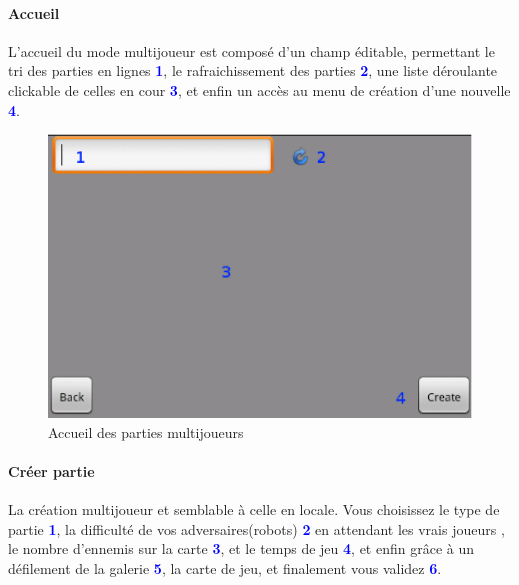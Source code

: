 	\paragraph{Accueil}
	L'accueil du mode multijoueur est composé d'un champ éditable, permettant le
	tri des parties en lignes \textcolor{blue}{\textbf{1}}, le rafraichissement des
	parties \textcolor{blue}{\textbf{2}}, une liste déroulante clickable de celles
	en cour \textcolor{blue}{\textbf{3}}, et enfin un accès au menu de création
	d'une nouvelle \textcolor{blue}{\textbf{4}}.
	
	\begin{figure}[H]
	\centering
		\includegraphics[scale=0.7]{Manuel/Img/19}
		\caption{Accueil des parties multijoueurs}
	\end{figure}
	
	\paragraph{Créer partie}
	La création multijoueur et semblable à celle en locale.
	Vous choisissez le type de partie
	\textcolor{blue}{\textbf{1}}, la difficulté de vos adversaires(robots)
	\textcolor{blue}{\textbf{2}} en attendant les vrais joueurs , le nombre d'ennemis
	sur la carte \textcolor{blue}{\textbf{3}}, et le temps de jeu \textcolor{blue}{\textbf{4}},
	et enfin grâce à un défilement de la galerie \textcolor{blue}{\textbf{5}}, la
	carte de jeu, et finalement vous validez \textcolor{blue}{\textbf{6}}.
	
